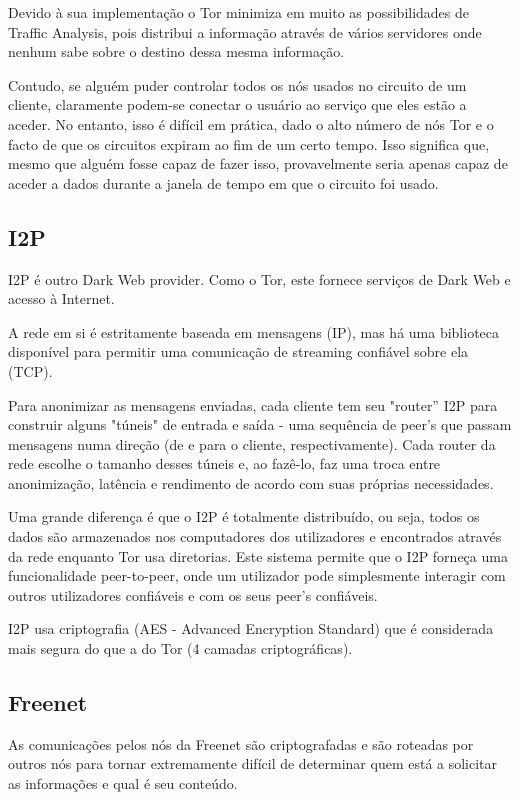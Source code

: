 \documentclass{llncs}
\begin{document}
Devido à sua implementação o Tor minimiza em muito as possibilidades de Traffic Analysis, pois distribui a informação através de vários servidores onde nenhum sabe sobre o destino dessa mesma informação.

Contudo, se alguém puder controlar todos os nós usados no circuito de um cliente, claramente podem-se conectar o usuário ao serviço que eles estão a aceder. No entanto, isso é difícil em prática, dado o alto número de nós Tor e o facto de que os circuitos expiram ao fim de um certo tempo. Isso significa que, mesmo que alguém fosse capaz de fazer isso, provavelmente seria apenas capaz de aceder a dados durante a janela de tempo em que o circuito foi usado. \cite{tord}


\subsection{I2P}

	I2P é outro Dark Web provider. Como o Tor, este fornece serviços de Dark Web e acesso à Internet.

A rede em si é estritamente baseada em mensagens (IP), mas há uma biblioteca disponível para permitir uma comunicação de streaming confiável sobre ela (TCP).

Para anonimizar as mensagens enviadas, cada cliente tem seu "router” I2P para construir alguns "túneis" de entrada e saída - uma sequência de peer’s que passam mensagens numa direção (de e para o cliente, respectivamente). Cada router da rede escolhe o tamanho desses túneis e, ao fazê-lo, faz uma troca entre anonimização, latência e rendimento de acordo com suas próprias necessidades. \cite{i2pweb}

Uma grande diferença é que o I2P é totalmente distribuído, ou seja, todos os dados são armazenados nos computadores dos utilizadores e encontrados através da rede enquanto Tor usa diretorias. Este sistema permite que o I2P forneça uma funcionalidade peer-to-peer, onde um utilizador pode simplesmente interagir com outros utilizadores confiáveis e com os seus peer’s confiáveis.

I2P usa criptografia (AES -  Advanced Encryption Standard) que é considerada mais segura do que a do Tor (4 camadas criptográficas). \cite{tord}

\subsection{Freenet}

	As comunicações pelos nós da Freenet são criptografadas e são roteadas por outros nós para tornar extremamente difícil de determinar quem está a solicitar as informações e qual é seu conteúdo.
	
\end{document}
